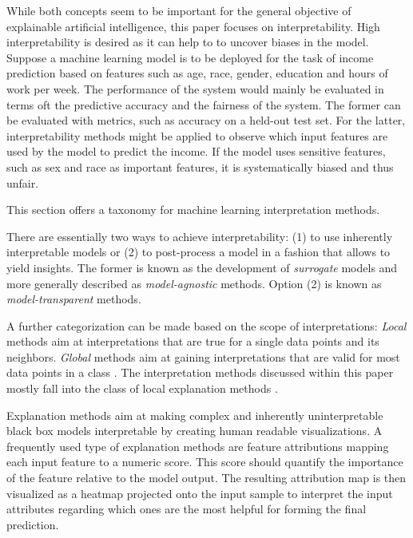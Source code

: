 While both concepts seem to be important for the general objective of explainable artificial intelligence, this paper focuses on interpretability. 
High interpretability is desired as it can help to to uncover biases in the model. Suppose a machine learning model is to be deployed for the task of income prediction based on features such as age, race, gender, education and hours of work per week. The performance of the system would mainly be evaluated in terms oft the predictive accuracy and the fairness of the system. The former can be evaluated with metrics, such as accuracy on a held-out test set. For the latter, interpretability methods might be applied to observe which input features are used by the model to predict the income. 
If the model uses sensitive features, such as sex and race as important features, it is systematically biased and thus unfair. 


This section offers a taxonomy for machine learning interpretation methods.

There are essentially two ways to achieve interpretability: (1) to use inherently interpretable models or (2) to post-process a model in a fashion that allows to yield insights. The former is known as the development of \textit{surrogate} models and more generally described as \textit{model-agnostic} methods. Option (2) is known as \textit{model-transparent} methods. 

A further categorization can be made based on the scope of interpretations: \textit{Local} methods aim at interpretations that are true for a single data points and its neighbors. 
\textit{Global} methods aim at gaining interpretations that are valid for most data points in a class \cite{kim2018interpretability, nguyen2017plug, yosinski2015understanding}. The interpretation methods discussed within this paper mostly fall into the class of local explanation methods \cite{ribeiro2016should, lundberg2017unified}. %

Explanation methods aim at making complex and inherently uninterpretable black box models interpretable by creating human readable visualizations. 
A frequently used type of explanation methods are feature attributions mapping each input feature to a numeric score. This score should quantify the importance of the feature relative to the model output. The resulting attribution map is then visualized as a heatmap projected onto the input sample to interpret the input attributes regarding which ones are the most helpful for forming the final prediction. 

